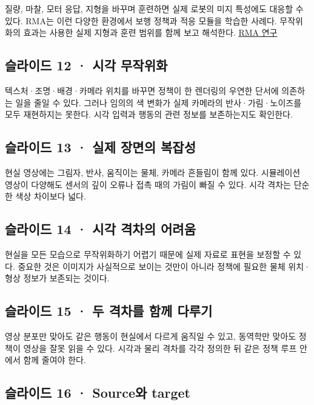 \documentclass[11pt,a4paper]{article}
\begin{document}
질량, 마찰, 모터 응답, 지형을 바꾸며 훈련하면 실제 로봇의 미지 특성에도 대응할 수 있다. RMA는 이런 다양한 환경에서 보행 정책과 적응 모듈을 학습한 사례다. 무작위화의 효과는 사용한 실제 지형과 훈련 범위를 함께 보고 해석한다. \href{https://arxiv.org/abs/2107.04034}{RMA 연구}\par

\subsection{슬라이드 12 · 시각 무작위화}

텍스처·조명·배경·카메라 위치를 바꾸면 정책이 한 렌더링의 우연한 단서에 의존하는 일을 줄일 수 있다. 그러나 임의의 색 변화가 실제 카메라의 반사·가림·노이즈를 모두 재현하지는 못한다. 시각 입력과 행동의 관련 정보를 보존하는지도 확인한다.\par

\subsection{슬라이드 13 · 실제 장면의 복잡성}

현실 영상에는 그림자, 반사, 움직이는 물체, 카메라 흔들림이 함께 있다. 시뮬레이션 영상이 다양해도 센서의 깊이 오류나 접촉 때의 가림이 빠질 수 있다. 시각 격차는 단순한 색상 차이보다 넓다.\par

\subsection{슬라이드 14 · 시각 격차의 어려움}

현실을 모든 모습으로 무작위화하기 어렵기 때문에 실제 자료로 표현을 보정할 수 있다. 중요한 것은 이미지가 사실적으로 보이는 것만이 아니라 정책에 필요한 물체 위치·형상 정보가 보존되는 것이다.\par

\subsection{슬라이드 15 · 두 격차를 함께 다루기}

영상 분포만 맞아도 같은 행동이 현실에서 다르게 움직일 수 있고, 동역학만 맞아도 정책이 영상을 잘못 읽을 수 있다. 시각과 물리 격차를 각각 정의한 뒤 같은 정책 루프 안에서 함께 줄여야 한다.\par

\subsection{슬라이드 16 · Source와 target}
\end{document}
